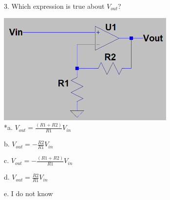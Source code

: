 
3. Which expression is true about $V_{out}$?

\includegraphics[width=3.46875in,height=2.1959in]{../../Images/OPampsTransistorsDiodesQ3.png} \\

*a. \( V_{out} = \frac{(R1 + R2)}{R1} V_{in} \)

b. \( V_{out} = - \frac{R2}{R1} V_{in} \) 

c. \( V_{out} = - \frac{(R1 + R2)}{R1} V_{in} \)

d. \( V_{out} = \frac{R2}{R1} V_{in} \)

e. I do not know \\
